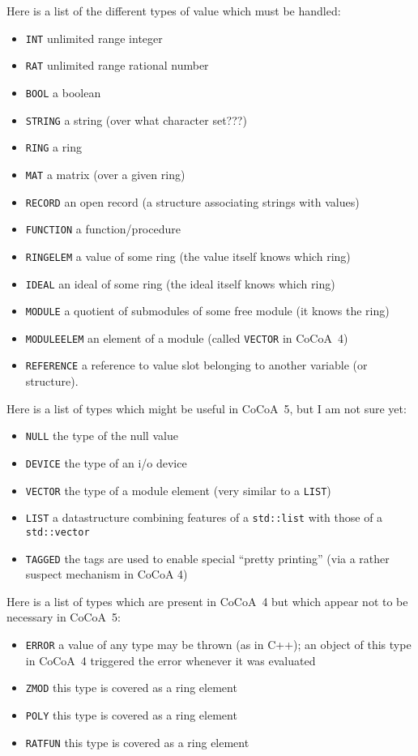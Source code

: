 \documentclass{book}[12,a4paper]
\begin{document}
Here is a list of the different types of value which must be handled:
\begin{itemize}
\item \texttt{INT} unlimited range integer
\item \texttt{RAT} unlimited range rational number
\item \texttt{BOOL} a boolean
\item \texttt{STRING} a string (over what character set???)
\item \texttt{RING} a ring
\item \texttt{MAT} a matrix (over a given ring)
\item \texttt{RECORD} an open record (a structure associating strings with values)
\item \texttt{FUNCTION} a function/procedure
\item \texttt{RINGELEM} a value of some ring (the value itself knows which ring)
\item \texttt{IDEAL} an ideal of some ring (the ideal itself knows which ring)
\item \texttt{MODULE} a quotient of submodules of some free module (it knows the ring)
\item \texttt{MODULEELEM} an element of a module (called \texttt{VECTOR} in CoCoA~4)
\item \texttt{REFERENCE} a reference to value slot belonging to another variable (or structure).
\end{itemize}

Here is a list of types which might be useful in CoCoA~5, but I am not sure yet:
\begin{itemize}
\item \texttt{NULL} the type of the null value
\item \texttt{DEVICE} the type of an i/o device
\item \texttt{VECTOR} the type of a module element (very similar to a \texttt{LIST})
\item \texttt{LIST} a datastructure combining features of a \texttt{std::list} with those of a \texttt{std::vector}
\item \texttt{TAGGED} the tags are used to enable special ``pretty printing'' (via a rather suspect mechanism in CoCoA 4)
\end{itemize}

Here is a list of types which are present in CoCoA~4 but which appear not to be
necessary in CoCoA~5:
\begin{itemize}
\item \texttt{ERROR} a value of any type may be thrown (as in C++); an object of
this type in CoCoA~4 triggered the error whenever it was evaluated
\item \texttt{ZMOD} this type is covered as a ring element
\item \texttt{POLY} this type is covered as a ring element
\item \texttt{RATFUN} this type is covered as a ring element
\end{itemize}
\end{document}
